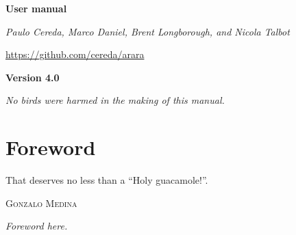 \documentclass[a4paper,twoside,12pt]{memoir}
\newcommand{\araraversion}{4.0}
\begin{document}
\begin{titlingpage}
\vspace*{2em}

\begin{center}
\scalebox{1.15}{\em add new logo here}

\vspace{2em}

\scalebox{10.5}{\arara}

\vspace{1em}

{\Huge\slogan}

\vspace{6em}

\begin{tcolorbox}[
  boxrule=0pt,
  colback=araracolour,
  top=1em,
  bottom=1em
]
  \color{white}
  \centering
  \Huge
  \sffamily
  \bfseries User manual
\end{tcolorbox}

\vspace{6em}

{\large\em Paulo Cereda, Marco Daniel, Brent Longborough, and Nicola Talbot}

\vspace{2em}

\url{https://github.com/cereda/arara}

\vfill

{\color{araracolour}
\LARGE
\sffamily
\bfseries
Version \araraversion}

\end{center}
\end{titlingpage}

\pagestyle{headings} 
\frontmatter
\nouppercaseheads

\cleardoublepage

\vspace*{25em}

\begin{flushright}
\em No birds were harmed in the making of this manual.
\end{flushright}

\chapter*{Foreword}
\label{chap:foreword}

\epigraph{That deserves no less than a ``Holy guacamole!''.}{\textsc{Gonzalo Medina}}

\emph{Foreword here.}

\vfill
\end{document}
